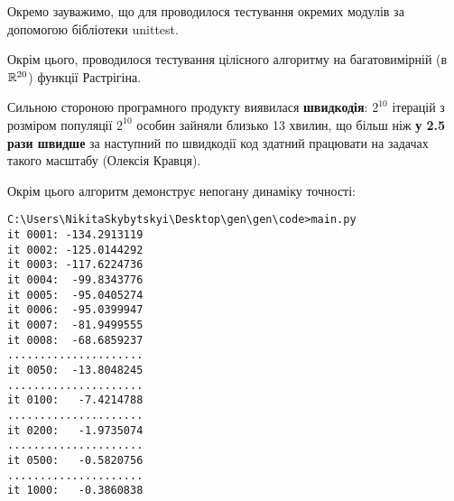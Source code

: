 \documentclass[a4paper, 12pt]{article}
\numberwithin{equation}{section}
\begin{document}
Окремо зауважимо, що для проводилося тестування окремих модулів за допомогою бібліотеки unittest. \medskip

Окрім цього, проводилося тестування цілісного алгоритму на багатовимірній (в $\mathbb{R}^{20}$) функції Растрігіна. \medskip

Сильною стороною програмного продукту виявилася \textbf{швидкодія}: $2^{10}$ ітерацій з розміром популяції $2^{10}$ особин зайняли близько 13 хвилин, що більш ніж \textbf{у 2.5 рази швидше} за наступний по швидкодії код здатний працювати на задачах такого масштабу (Олексія Кравця). \medskip

Окрім цього алгоритм демонструє непогану динаміку точності:
\begin{verbatim}
C:\Users\NikitaSkybytskyi\Desktop\gen\gen\code>main.py
it 0001: -134.2913119
it 0002: -125.0144292
it 0003: -117.6224736
it 0004:  -99.8343776
it 0005:  -95.0405274
it 0006:  -95.0399947
it 0007:  -81.9499555
it 0008:  -68.6859237
.....................
it 0050:  -13.8048245
.....................
it 0100:   -7.4214788
.....................
it 0200:   -1.9735074
.....................
it 0500:   -0.5820756
.....................
it 1000:   -0.3860838
\end{verbatim}



\end{document}
